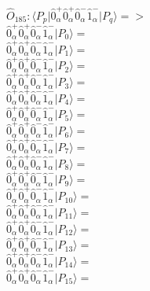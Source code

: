 \documentclass[14pt]{article}
\begin{document}
    $\hat{O}_{185}:  \langle{P_p}\vert \hat{0}_{\alpha}^{+}\hat{0}_{\alpha}^{+}\hat{0}_{\alpha}^{-}\hat{1}_{\alpha}^{-} \vert{P_q}\rangle => $ \\ 
    $ \hat{0}_{\alpha}^{+}\hat{0}_{\alpha}^{+}\hat{0}_{\alpha}^{-}\hat{1}_{\alpha}^{-} \vert{P_{0}}\rangle =  $ \\ 
    $ \hat{0}_{\alpha}^{+}\hat{0}_{\alpha}^{+}\hat{0}_{\alpha}^{-}\hat{1}_{\alpha}^{-} \vert{P_{1}}\rangle =  $ \\ 
    $ \hat{0}_{\alpha}^{+}\hat{0}_{\alpha}^{+}\hat{0}_{\alpha}^{-}\hat{1}_{\alpha}^{-} \vert{P_{2}}\rangle =  $ \\ 
    $ \hat{0}_{\alpha}^{+}\hat{0}_{\alpha}^{+}\hat{0}_{\alpha}^{-}\hat{1}_{\alpha}^{-} \vert{P_{3}}\rangle =  $ \\ 
    $ \hat{0}_{\alpha}^{+}\hat{0}_{\alpha}^{+}\hat{0}_{\alpha}^{-}\hat{1}_{\alpha}^{-} \vert{P_{4}}\rangle =  $ \\ 
    $ \hat{0}_{\alpha}^{+}\hat{0}_{\alpha}^{+}\hat{0}_{\alpha}^{-}\hat{1}_{\alpha}^{-} \vert{P_{5}}\rangle =  $ \\ 
    $ \hat{0}_{\alpha}^{+}\hat{0}_{\alpha}^{+}\hat{0}_{\alpha}^{-}\hat{1}_{\alpha}^{-} \vert{P_{6}}\rangle =  $ \\ 
    $ \hat{0}_{\alpha}^{+}\hat{0}_{\alpha}^{+}\hat{0}_{\alpha}^{-}\hat{1}_{\alpha}^{-} \vert{P_{7}}\rangle =  $ \\ 
    $ \hat{0}_{\alpha}^{+}\hat{0}_{\alpha}^{+}\hat{0}_{\alpha}^{-}\hat{1}_{\alpha}^{-} \vert{P_{8}}\rangle =  $ \\ 
    $ \hat{0}_{\alpha}^{+}\hat{0}_{\alpha}^{+}\hat{0}_{\alpha}^{-}\hat{1}_{\alpha}^{-} \vert{P_{9}}\rangle =  $ \\ 
    $ \hat{0}_{\alpha}^{+}\hat{0}_{\alpha}^{+}\hat{0}_{\alpha}^{-}\hat{1}_{\alpha}^{-} \vert{P_{10}}\rangle =  $ \\ 
    $ \hat{0}_{\alpha}^{+}\hat{0}_{\alpha}^{+}\hat{0}_{\alpha}^{-}\hat{1}_{\alpha}^{-} \vert{P_{11}}\rangle =  $ \\ 
    $ \hat{0}_{\alpha}^{+}\hat{0}_{\alpha}^{+}\hat{0}_{\alpha}^{-}\hat{1}_{\alpha}^{-} \vert{P_{12}}\rangle =  $ \\ 
    $ \hat{0}_{\alpha}^{+}\hat{0}_{\alpha}^{+}\hat{0}_{\alpha}^{-}\hat{1}_{\alpha}^{-} \vert{P_{13}}\rangle =  $ \\ 
    $ \hat{0}_{\alpha}^{+}\hat{0}_{\alpha}^{+}\hat{0}_{\alpha}^{-}\hat{1}_{\alpha}^{-} \vert{P_{14}}\rangle =  $ \\ 
    $ \hat{0}_{\alpha}^{+}\hat{0}_{\alpha}^{+}\hat{0}_{\alpha}^{-}\hat{1}_{\alpha}^{-} \vert{P_{15}}\rangle =  $ \\ 
    
\end{document}
